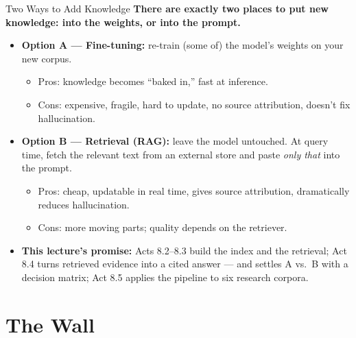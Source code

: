 \begin{frame}{Two Ways to Add Knowledge}
\textbf{There are exactly two places to put new knowledge: into the weights, or into the prompt.}

\medskip
\begin{itemize}
\item \textbf{Option A --- Fine-tuning:} re-train (some of) the model's weights on your new corpus.
\begin{itemize}
    \item Pros: knowledge becomes ``baked in,'' fast at inference.
    \item Cons: expensive, fragile, hard to update, no source attribution, doesn't fix hallucination.
\end{itemize}

\medskip
\item \textbf{Option B --- Retrieval (RAG):} leave the model untouched. At query time, fetch the relevant text from an external store and paste \emph{only that} into the prompt.
\begin{itemize}
    \item Pros: cheap, updatable in real time, gives source attribution, dramatically reduces hallucination.
    \item Cons: more moving parts; quality depends on the retriever.
\end{itemize}

\medskip
\item \textbf{This lecture's promise:} Acts 8.2--8.3 build the index and the retrieval; Act 8.4 turns retrieved evidence into a cited answer --- and settles A vs.\ B with a decision matrix; Act 8.5 applies the pipeline to six research corpora.
\end{itemize}
\end{frame}

\section{The Wall}

